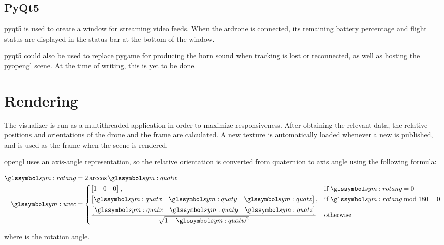     \subsection{PyQt5}
    \gls{pyqt5} is used to create a window for streaming video feeds.
    When the \gls{ardrone} is connected, its remaining battery percentage and flight status are displayed in the status bar at the bottom of the window.

    \gls{pyqt5} could also be used to replace \gls{pygame} for producing the horn sound when tracking is lost or reconnected, as well as hosting the \gls{pyopengl} scene.
    At the time of writing, this is yet to be done.

  \section{Rendering}
    The visualizer is run as a multithreaded application in order to maximize responsiveness.
    After obtaining the relevant data, the relative positions and orientations of the drone and the frame are calculated.
    A new texture is automatically loaded whenever a new \texttt{} is published, and is used as the frame when the scene is rendered.

    \gls{opengl} uses an axis-angle representation, so the relative orientation is converted from quaternion to axis angle using the following formula:

    \begin{align}
      \sym{rotang} &= 2\arccos\sym{quatw} \\
      \sym{uvec} &= 
      \begin{dcases}
	\begin{bmatrix}1 & 0 & 0\end{bmatrix},& \text{if } \sym{rotang} = 0 \\
	\begin{bmatrix}\sym{quatx} & \sym{quaty} & \sym{quatz}\end{bmatrix},& \text{if } \sym{rotang} \bmod 180 = 0 \\
      \frac{\begin{bmatrix}\sym{quatx} & \sym{quaty} & \sym{quatz}\end{bmatrix}}{\sqrt{1 - \sym{quatw}^2}} & \text{otherwise}
      \end{dcases}
    \end{align}

    where  is the rotation angle.


